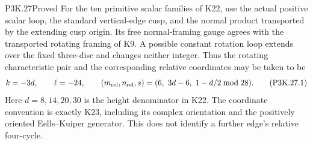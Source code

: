 \begin{statement}{P3K.27}{Proved}
For the ten primitive scalar families of K22, use the actual
positive scalar loop, the standard vertical-edge cusp, and the
normal product transported by the extending cusp origin. Its
free normal-framing gauge agrees with the transported rotating
framing of K9. A possible constant rotation loop extends over
the fixed three-disc and changes neither integer. Thus the
rotating characteristic pair and the corresponding relative
coordinates may be taken to be
\[
       k=-3d,\qquad \ell=-24,\qquad
       (m_{\rm rel},n_{\rm rel},s)
             =(6,\ 3d-6,\ 1-d/2\bmod28).
                                                        \tag{P3K.27.1}
\]
Here \(d=8,14,20,30\) is the height denominator in K22. The
coordinate convention is exactly K23, including its complex
orientation and the positively oriented Eells--Kuiper generator.
This does not identify a further edge's relative four-cycle.
\end{statement}
